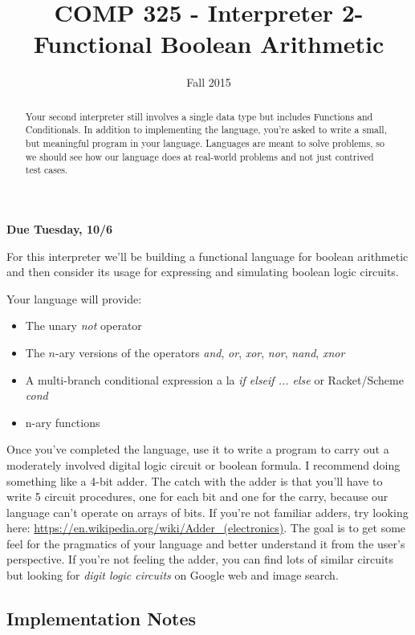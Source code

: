 \documentclass[10pt]{article}
\title{COMP 325 - Interpreter 2- Functional Boolean Arithmetic}
\author{  }
\date{Fall 2015}
\begin{document}
\maketitle

\begin{abstract}
Your second interpreter still involves a single data type but includes Functions and Conditionals.  In addition to implementing the language, you're asked to write a small, but meaningful program in your language. Languages are meant to solve problems, so we should see how our language does at real-world problems and not just contrived test cases.
\end{abstract}

\begin{center}
\textbf{Due Tuesday, 10/6}
\end{center}

For this interpreter we'll be building a functional language for boolean arithmetic and then consider its usage for expressing and simulating boolean logic circuits. 

Your language will provide:
\begin{itemize}
\item The unary \textit{not} operator
\item The $n$-ary versions of the operators \textit{and}, \textit{or}, \textit{xor}, \textit{nor}, \textit{nand}, \textit{xnor}
\item A multi-branch conditional expression a la \textit{if elseif ... else} or Racket/Scheme \textit{cond}
\item n-ary functions 
\end{itemize}

Once you've completed the language, use it to write a program to carry out a moderately involved digital logic circuit or boolean formula. I recommend doing something like a 4-bit adder. The catch with the adder is that you'll have to write 5 circuit procedures, one for each bit and one for the carry, because our language can't operate on arrays of bits. If you're not familiar adders, try looking here: \url{https://en.wikipedia.org/wiki/Adder_(electronics)}.  The goal is to get some feel for the pragmatics of your language and better understand it from the user's perspective.  If you're not feeling the adder, you can find lots of similar circuits but looking for \textit{digit logic circuits} on Google web and image search.

\subsection{Implementation Notes}
\end{document}
